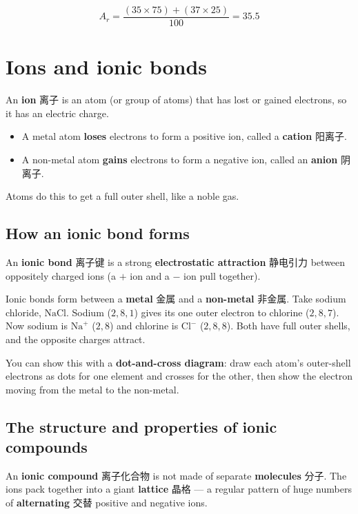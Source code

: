 \documentclass[11pt]{article}
\begin{document}
\[
A_r = \frac{(35 \times 75) + (37 \times 25)}{100} = 35.5
\]

\section*{Ions and ionic bonds}

An \textbf{ion} 离子 is an atom (or group of atoms) that has lost or gained electrons, so it has an electric charge.

\begin{itemize}
\item A metal atom \textbf{loses} electrons to form a positive ion, called a \textbf{cation} 阳离子.

\item A non-metal atom \textbf{gains} electrons to form a negative ion, called an \textbf{anion} 阴离子.

\end{itemize}

Atoms do this to get a full outer shell, like a noble gas.

\subsection*{How an ionic bond forms}

An \textbf{ionic bond} 离子键 is a strong \textbf{electrostatic attraction} 静电引力 between oppositely charged ions (a $+$ ion and a $-$ ion pull together).

Ionic bonds form between a \textbf{metal} 金属 and a \textbf{non-metal} 非金属. Take sodium chloride, $\text{NaCl}$. Sodium ($2,8,1$) gives its one outer electron to chlorine ($2,8,7$). Now sodium is $\text{Na}^{+}$ ($2,8$) and chlorine is $\text{Cl}^{-}$ ($2,8,8$). Both have full outer shells, and the opposite charges attract.

You can show this with a \textbf{dot-and-cross diagram}: draw each atom's outer-shell electrons as dots for one element and crosses for the other, then show the electron moving from the metal to the non-metal.

\subsection*{The structure and properties of ionic compounds}

An \textbf{ionic compound} 离子化合物 is not made of separate \textbf{molecules} 分子. The ions pack together into a giant \textbf{lattice} 晶格 — a regular pattern of huge numbers of \textbf{alternating} 交替 positive and negative ions.
\end{document}
